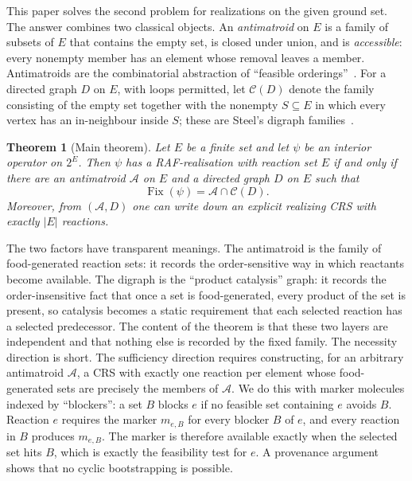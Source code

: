 \documentclass[11pt,a4paper]{article}
\theoremstyle{plain}
\newtheorem{theorem}{Theorem}[section]
\theoremstyle{definition}
\theoremstyle{remark}
\newcommand{\Fix}{\operatorname{Fix}}
\newcommand{\cA}{\mathcal{A}}
\newcommand{\cC}{\mathcal{C}}
\newcommand{\pw}[1]{2^{#1}}
\begin{document}
This paper solves the second problem for realizations on the given ground set. The answer combines two classical objects. An \emph{antimatroid} on $E$ is a family of subsets of $E$ that contains the empty set, is closed under union, and is \emph{accessible}: every nonempty member has an element whose removal leaves a member. Antimatroids are the combinatorial abstraction of ``feasible orderings''~\cite{korte1984shelling,edelman1985theory,korte1991greedoids,bjorner1992greedoids}. For a directed graph $D$ on $E$, with loops permitted, let $\cC(D)$ denote the family consisting of the empty set together with the nonempty $S\subseteq E$ in which every vertex has an in-neighbour inside $S$; these are Steel's digraph families~\cite{steel2023interior}.

\begin{theorem}[Main theorem]\label{thm:main-intro}
Let $E$ be a finite set and let $\psi$ be an interior operator on $\pw{E}$. Then $\psi$ has a RAF-realisation with reaction set $E$ if and only if there are an antimatroid $\cA$ on $E$ and a directed graph $D$ on $E$ such that
\[
\Fix(\psi)=\cA\cap\cC(D).
\]
Moreover, from $(\cA,D)$ one can write down an explicit realizing CRS with exactly $|E|$ reactions.
\end{theorem}

The two factors have transparent meanings. The antimatroid is the family of food-generated reaction sets: it records the order-sensitive way in which reactants become available. The digraph is the ``product catalysis'' graph: it records the order-insensitive fact that once a set is food-generated, every product of the set is present, so catalysis becomes a static requirement that each selected reaction has a selected predecessor. The content of the theorem is that these two layers are independent and that nothing else is recorded by the fixed family. The necessity direction is short. The sufficiency direction requires constructing, for an arbitrary antimatroid $\cA$, a CRS with exactly one reaction per element whose food-generated sets are precisely the members of $\cA$. We do this with marker molecules indexed by ``blockers'': a set $B$ blocks $e$ if no feasible set containing $e$ avoids $B$. Reaction $e$ requires the marker $m_{e,B}$ for every blocker $B$ of $e$, and every reaction in $B$ produces $m_{e,B}$. The marker is therefore available exactly when the selected set hits $B$, which is exactly the feasibility test for $e$. A provenance argument shows that no cyclic bootstrapping is possible.
\end{document}
